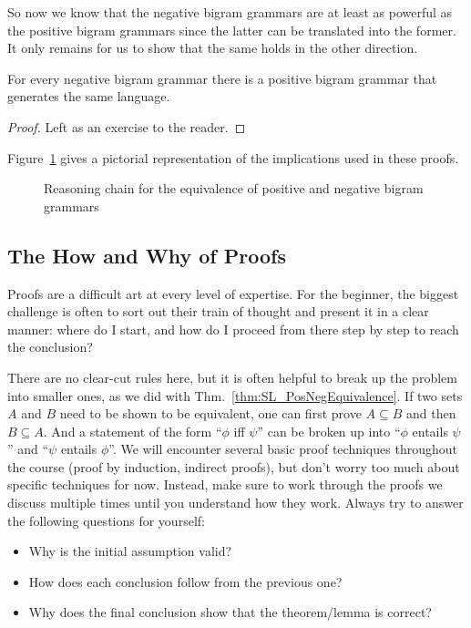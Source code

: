 So now we know that the negative bigram grammars are at least as powerful as the positive bigram grammars since the latter can be translated into the former.
It only remains for us to show that the same holds in the other direction.

\begin{lemma}
    For every negative bigram grammar there is a positive bigram grammar that generates the same language.
\end{lemma}
%
\begin{proof}
    Left as an exercise to the reader.
\end{proof}
%
Figure~\ref{fig:SL_Proof} gives a pictorial representation of the implications used in these proofs.
%
\begin{figure}
\centering

\caption{Reasoning chain for the equivalence of positive and negative bigram grammars}
\label{fig:SL_Proof}
\end{figure}

\subsection{The How and Why of Proofs}

Proofs are a difficult art at every level of expertise.
For the beginner, the biggest challenge is often to sort out their train of thought and present it in a clear manner: where do I start, and how do I proceed from there step by step to reach the conclusion?

There are no clear-cut rules here, but it is often helpful to break up the problem into smaller ones, as we did with Thm.~\ref{thm:SL_PosNegEquivalence}.
If two sets $A$ and $B$ need to be shown to be equivalent, one can first prove $A \subseteq B$ and then $B \subseteq A$.
And a statement of the form ``$\phi$ iff $\psi$'' can be broken up into ``$\phi$ entails $\psi$'' and ``$\psi$ entails $\phi$''.
We will encounter several basic proof techniques throughout the course (proof by induction, indirect proofs), but don't worry too much about specific techniques for now.
Instead, make sure to work through the proofs we discuss multiple times until you understand how they work.
Always try to answer the following questions for yourself:

\begin{itemize}
    \item Why is the initial assumption valid?
    \item How does each conclusion follow from the previous one?
    \item Why does the final conclusion show that the theorem\slash lemma is correct?
\end{itemize}

